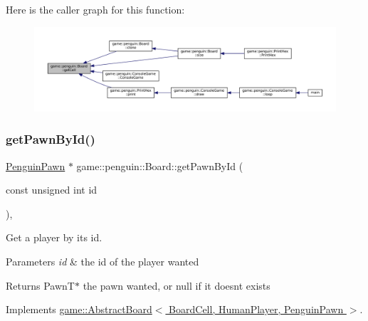 Here is the caller graph for this function\+:
\nopagebreak
\begin{figure}[H]
\begin{center}
\leavevmode
\includegraphics[width=350pt]{classgame_1_1penguin_1_1_board_ac9fbe04a302208fcb5f66e717182b6d4_icgraph}
\end{center}
\end{figure}
\mbox{\label{classgame_1_1penguin_1_1_board_acae84c13dacef3bd988d1ea9a41d055f}} 
\subsubsection{\texorpdfstring{get\+Pawn\+By\+Id()}{getPawnById()}\hspace{0.1cm}{\footnotesize\ttfamily [1/2]}}
{\footnotesize\ttfamily \hyperlink{classgame_1_1penguin_1_1_penguin_pawn}{Penguin\+Pawn} $\ast$ game\+::penguin\+::\+Board\+::get\+Pawn\+By\+Id (\begin{DoxyParamCaption}\item[{const unsigned int}]{id }\end{DoxyParamCaption})\hspace{0.3cm}{\ttfamily [override]}, {\ttfamily [virtual]}}



Get a player by it\textquotesingle{}s id. 


\begin{DoxyParams}{Parameters}
{\em id} & the id of the player wanted \\
\hline
\end{DoxyParams}
\begin{DoxyReturn}{Returns}
Pawn\+T$\ast$ the pawn wanted, or null if it doesn\textquotesingle{}t exists 
\end{DoxyReturn}


Implements \hyperlink{classgame_1_1_abstract_board_a5d80fa5f0809c746349fc1bab1d8999b}{game\+::\+Abstract\+Board$<$ Board\+Cell, Human\+Player, Penguin\+Pawn $>$}.

